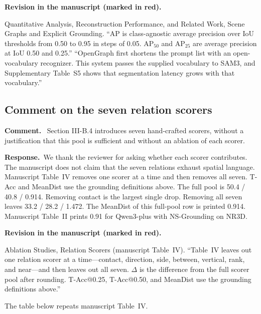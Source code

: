 \documentclass[11pt]{article}
\newcommand{\revcomment}[1]{%
  \par\vspace{0.6em}\noindent\textcolor{revblue}{\textbf{Comment.}}\ %
  \textcolor{revblue}{#1}\par\vspace{0.4em}}
\newcommand{\revresponse}[1]{%
  \par\noindent\textbf{Response.}\ #1\par\vspace{0.3em}}
\newcommand{\revchange}[1]{%
  \par\noindent\textbf{Revision in the manuscript (marked in red).}\par
  \noindent\textcolor{revred}{#1}\par\vspace{0.8em}}
\begin{document}
\revchange{Quantitative Analysis, Reconstruction Performance, and Related Work, Scene Graphs and Explicit Grounding. ``AP is class-agnostic average precision over IoU thresholds from 0.50 to 0.95 in steps of 0.05. AP\(_{50}\) and AP\(_{25}\) are average precision at IoU 0.50 and 0.25.'' ``OpenGraph first shortens the prompt list with an open-vocabulary recognizer. This system passes the supplied vocabulary to SAM3, and Supplementary Table~S5 shows that segmentation latency grows with that vocabulary.''}

\subsection*{Comment on the seven relation scorers}

\revcomment{Section III-B.4 introduces seven hand-crafted scorers, without a justification that this pool is sufficient and without an ablation of each scorer.}

\revresponse{We thank the reviewer for asking whether each scorer contributes. The manuscript does not claim that the seven relations exhaust spatial language. Manuscript Table~IV removes one scorer at a time and then removes all seven. T-Acc and MeanDist use the grounding definitions above. The full pool is 50.4 / 40.8 / 0.914. Removing contact is the largest single drop. Removing all seven leaves 33.2 / 28.2 / 1.472. The MeanDist of this full-pool row is printed 0.914. Manuscript Table~II prints 0.91 for Qwen3-plus with NS-Grounding on NR3D.}

\revchange{Ablation Studies, Relation Scorers (manuscript Table~IV). ``Table~IV leaves out one relation scorer at a time---contact, direction, side, between, vertical, rank, and near---and then leaves out all seven. \(\Delta\) is the difference from the full scorer pool after rounding. T-Acc@0.25, T-Acc@0.50, and MeanDist use the grounding definitions above.''}

\noindent The table below repeats manuscript Table~IV.
\end{document}
